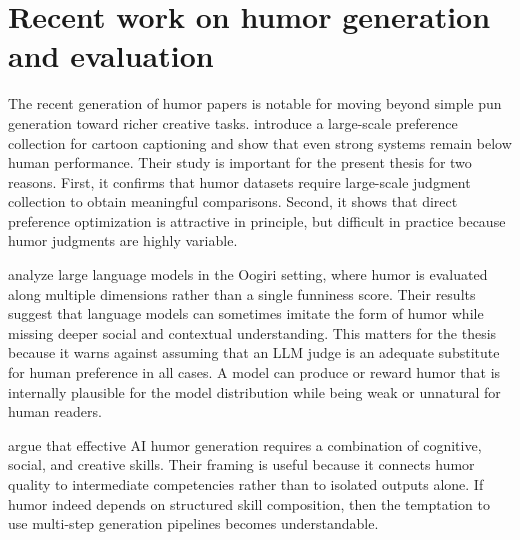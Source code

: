 \documentclass[14pt,a4paper]{extreport}
\begin{document}
\section{Recent work on humor generation and evaluation}


The recent generation of humor papers is notable for moving beyond simple pun generation toward richer creative tasks. \citet{Zhang2024HumorAI} introduce a large-scale preference collection for cartoon captioning and show that even strong systems remain below human performance. Their study is important for the present thesis for two reasons. First, it confirms that humor datasets require large-scale judgment collection to obtain meaningful comparisons. Second, it shows that direct preference optimization is attractive in principle, but difficult in practice because humor judgments are highly variable.

\citet{Sakabe2025} analyze large language models in the Oogiri setting, where humor is evaluated along multiple dimensions rather than a single funniness score. Their results suggest that language models can sometimes imitate the form of humor while missing deeper social and contextual understanding. This matters for the thesis because it warns against assuming that an LLM judge is an adequate substitute for human preference in all cases. A model can produce or reward humor that is internally plausible for the model distribution while being weak or unnatural for human readers.

\citet{Kim2025} argue that effective AI humor generation requires a combination of cognitive, social, and creative skills. Their framing is useful because it connects humor quality to intermediate competencies rather than to isolated outputs alone. If humor indeed depends on structured skill composition, then the temptation to use multi-step generation pipelines becomes understandable.
\end{document}
